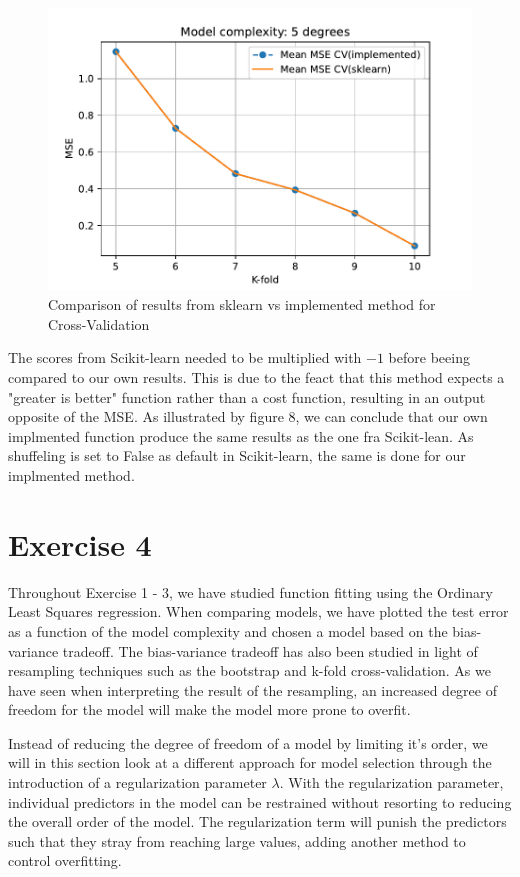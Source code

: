 \documentclass[11pt, a4paper]{article}
\begin{document}
\begin{figure}[h]
  \centering
  \includegraphics[scale=0.75]{figures/EX3_sk_vs_implemented_CV.pdf}
  \caption{\label{fig:?}Comparison of results from sklearn vs implemented method for Cross-Validation}
\end{figure}


The scores from Scikit-learn needed to be multiplied with $-1$ before beeing compared to our own results. This is due to the feact that this method expects a "greater is better" function rather than a cost function, resulting in an output opposite of the MSE.\cite{Geron2019} As illustrated by figure 8, we can conclude that our own implmented function produce the same results as the one fra Scikit-lean. As shuffeling is set to False as default in Scikit-learn, the same is done for our implmented method.





\section*{Exercise 4}
Throughout Exercise 1 - 3, we have studied function fitting using the Ordinary Least Squares regression. When comparing models, we have plotted the test error as a function of the model complexity and chosen a model based on the bias-variance tradeoff. The bias-variance tradeoff has also been studied in light of resampling techniques such as the bootstrap and k-fold cross-validation. As we have seen when interpreting the result of the resampling, an increased degree of freedom for the model will make the model more prone to overfit.

Instead of reducing the degree of freedom of a model by limiting it's order, we will in this section look at a different approach for model selection through the introduction of a regularization parameter $\lambda$. With the regularization parameter, individual predictors in the model can be restrained without resorting to reducing the overall order of the model. The regularization term will punish the predictors such that they stray from reaching large values, adding another method to control overfitting. \cite{Bishop2016}
\end{document}
